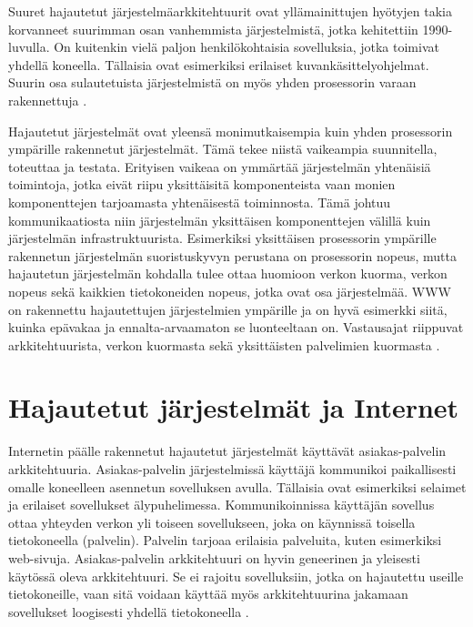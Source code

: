 \documentclass[utf8]{gradu3}
\begin{document}
Suuret hajautetut järjestelmäarkkitehtuurit ovat yllämainittujen hyötyjen takia korvanneet suurimman osan vanhemmista järjestelmistä, jotka kehitettiin 1990-luvulla. On kuitenkin vielä paljon henkilökohtaisia sovelluksia, jotka toimivat yhdellä koneella. Tällaisia ovat esimerkiksi erilaiset kuvankäsittelyohjelmat. Suurin osa sulautetuista järjestelmistä on myös yhden prosessorin varaan rakennettuja \parencite[s. 480]{Sommerville}. 

Hajautetut järjestelmät ovat yleensä monimutkaisempia kuin yhden prosessorin ympärille rakennetut järjestelmät. Tämä tekee niistä vaikeampia suunnitella, toteuttaa ja testata. Erityisen vaikeaa on ymmärtää järjestelmän yhtenäisiä toimintoja, jotka eivät riipu yksittäisitä komponenteista vaan monien komponenttejen tarjoamasta yhtenäisestä toiminnosta. Tämä johtuu kommunikaatiosta niin järjestelmän yksittäisen komponenttejen välillä kuin järjestelmän infrastruktuurista. Esimerkiksi yksittäisen prosessorin ympärille rakennetun järjestelmän suoristuskyvyn perustana on prosessorin nopeus, mutta hajautetun järjestelmän kohdalla tulee ottaa huomioon verkon kuorma, verkon nopeus sekä kaikkien tietokoneiden nopeus, jotka ovat osa järjestelmää. WWW on rakennettu hajautettujen järjestelmien ympärille ja on hyvä esimerkki siitä, kuinka epävakaa ja ennalta-arvaamaton se luonteeltaan on. Vastausajat riippuvat arkkitehtuurista, verkon kuormasta sekä yksittäisten palvelimien kuormasta  \parencite[s. 481]{Sommerville}. 

\section{Hajautetut järjestelmät ja Internet}

Internetin päälle rakennetut hajautetut järjestelmät käyttävät asiakas-palvelin arkkitehtuuria. Asiakas-palvelin järjestelmissä käyttäjä kommunikoi paikallisesti omalle koneelleen asennetun sovelluksen avulla. Tällaisia ovat esimerkiksi selaimet ja erilaiset sovellukset älypuhelimessa. Kommunikoinnissa käyttäjän sovellus ottaa yhteyden verkon yli toiseen sovellukseen, joka on käynnissä toisella tietokoneella (palvelin). Palvelin tarjoaa erilaisia palveluita, kuten esimerkiksi web-sivuja. Asiakas-palvelin arkkitehtuuri on hyvin geneerinen ja yleisesti käytössä oleva arkkitehtuuri. Se ei rajoitu sovelluksiin, jotka on hajautettu useille tietokoneille, vaan sitä voidaan käyttää myös arkkitehtuurina jakamaan sovellukset loogisesti yhdellä tietokoneella \parencite[s.488]{Sommerville}.
\end{document}
